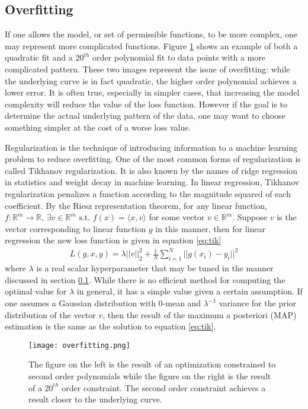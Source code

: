 \subsection{Overfitting} \label{sec:overfitting}
If one allows the model, or set of permissible functions, to be more complex, one may represent more complicated functions.  Figure \ref{fig:poly_reg} shows an example of both a quadratic fit and a $20^{th}$ order polynomial fit to data points with a more complicated pattern.  These two images represent the issue of overfitting: while the underlying curve is in fact quadratic, the higher order polynomial achieves a lower error.  It is often true, especially in simpler cases, that increasing the model complexity will reduce the value of the loss function.  However if the goal is to determine the actual underlying pattern of the data, one may want to choose something simpler at the cost of a worse loss value.

Regularization is the technique of introducing information to a machine learning problem to reduce overfitting.  One of the most common forms of regularization is called Tikhanov regularization.  It is also known by the names of ridge regression in statistics and weight decay in machine learning.  In linear regression, Tikhanov regularization penalizes a function according to the magnitude squared of each coefficient.  By the Riesz representation theorem, for any linear function, $f: \mathbb{R}^m \rightarrow \mathbb{R}$, $\exists v\in\mathbb{R}^m \text{ s.t. } f(x) = \langle x,v\rangle $ for some vector $v\in \mathbb{R}^m$.  Suppose $v$ is the vector corresponding to linear function $g$ in this manner, then for linear regression the new loss function is given in equation \ref{eq:tik}
\begin{align}\label{eq:tik}
L(g,x,y) = \lambda ||v||_2^2 + \frac{1}{N}\sum_{i=1}^N ||g(x_i)-y_i||^2
\end{align}
where $\lambda$ is a real scalar hyperparameter that may be tuned in the manner discussed in section \ref{sec:overfitting}.  While there is no efficient method for computing the optimal value for $\lambda$ in general, it has a simple value given a certain assumption.  If one assumes a Gaussian distribution with 0-mean and $\lambda^{-1}$ variance for the prior distribution of the vector $v$, then the result of the maximum a posteriori (MAP) estimation is the same as the solution to equation \ref{eq:tik}.

\begin{figure}
    \centering
    \texttt{[image: overfitting.png]}
    \caption{The figure on the left is the result of an optimization constrained to second order polynomials while the figure on the right is the result of a $20^{th}$ order constraint.  The second order constraint achieves a result closer to the underlying curve.}
    \label{fig:poly_reg}
\end{figure}

